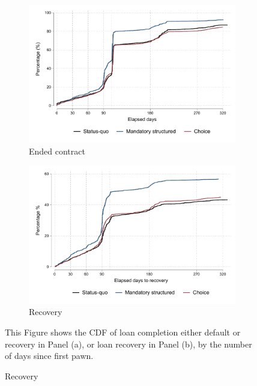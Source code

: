 \begin{appendix}
\begin{figure}[H]
\caption{Survival graph.}
    \begin{center}
   \begin{subfigure}{0.49\textwidth}
   \caption{Ended contract}
        \centering
        \includegraphics[width=\textwidth]{Figuras/survival_graph_ended.pdf}
    \end{subfigure} 
   \begin{subfigure}{0.49\textwidth}
   \caption{Recovery}
        \centering
        \includegraphics[width=\textwidth]{Figuras/survival_graph_unpledge.pdf}
    \end{subfigure}     
    \end{center}
      \footnotesize{This Figure shows the CDF of loan completion either default or recovery in Panel (a), or loan recovery in Panel (b), by the number of days since first pawn.}
      \label{survival_graph}
\end{figure}


\end{appendix}
